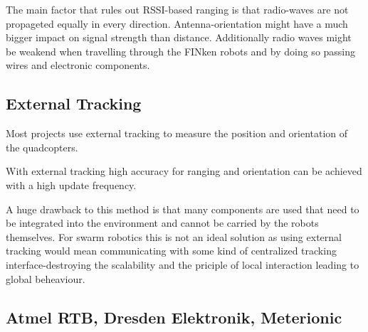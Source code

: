 The main factor that rules out RSSI-based ranging is that radio-waves are not propageted equally in every direction. 
Antenna-orientation might have a much bigger impact on signal strength than distance.
Additionally radio waves might be weakend when travelling through the FINken robots and by doing so passing wires and electronic components.

\subsection{External Tracking}

Most projects use external tracking to measure the position and orientation of the quadcopters. 

With external tracking high accuracy for ranging and orientation can be achieved with a high update frequency.


A huge drawback to this method is that many components are used that need to be integrated into the environment and cannot be carried by the robots themselves.
For swarm robotics this is not an ideal solution as using external tracking would mean communicating with some kind of centralized tracking interface-destroying the scalability and the priciple of local interaction leading to global beheaviour.
\subsection{Atmel RTB, Dresden Elektronik, Meterionic}

